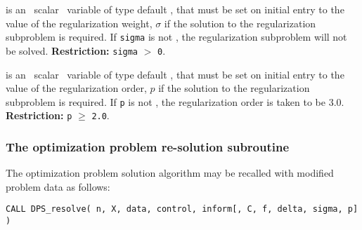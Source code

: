 \documentclass{galahad}
\newcommand{\packagename}{DPS}
\begin{document}
\begin{description}
 is an \optional\ scalar \intentin\ variable of type default
\realdp, that must be set on initial entry
to the value of the regularization weight, $\sigma$
if the solution to the regularization subproblem  is required.
If {\tt sigma} is not \present, the regularization subproblem will not be
solved.
{\bf Restriction: } {\tt sigma} $>$ {\tt 0}.

 is an \optional\ scalar \intentin\ variable of type default
\realdp, that must be set on initial entry
to the value of the regularization order, $p$
if the solution to the regularization subproblem  is required.
If {\tt p} is not \present, the regularization order is taken to be
$3.0$.
{\bf Restriction: } {\tt p} $\geq$ {\tt 2.0}.


\end{description}


\subsubsection{The optimization problem re-solution subroutine}
The optimization problem solution algorithm may be recalled
with modified problem data as follows:

\hskip0.5in
{\tt CALL \packagename\_resolve( n, X, data, control, inform[, C, f, delta, sigma, p] )}
\end{document}
